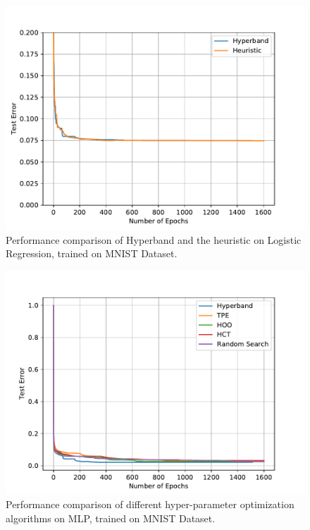 \documentclass[runningheads,a4paper]{llncs}
\begin{document}
\begin{figure}[ht]
    \centering
    \includegraphics[scale=0.8]{img/mnist/logistic_1_bis.pdf}
    \caption{Performance comparison of Hyperband and the heuristic on Logistic Regression, trained on MNIST Dataset.}
    \label{logistic_1_bis}
\end{figure}

\begin{figure}[ht]
    \centering
    \includegraphics[scale=0.8]{img/mnist/mlp_0.pdf}
    \caption{Performance comparison of different hyper-parameter optimization algorithms on MLP, trained on MNIST Dataset.}
    \label{mlp_0}
\end{figure}
\end{document}
